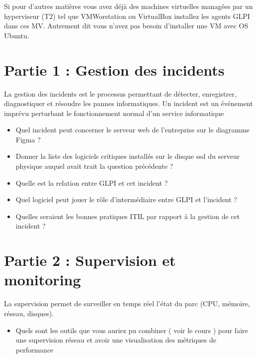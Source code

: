\documentclass[12pt, letterpaper]{article}
\begin{document}
\begin{tcolorbox}[colback=orange!5,colframe=orange!60!black,title=Attention]
Si pour d'autres matières vous avez déjà des machines virtuelles managées par un hyperviseur (T2) tel que VMWorstation ou VirtualBox 
installez les agents GLPI dans ces MV. Autrement dit vous n'avez pas besoin d'installer une VM avec OS Ubuntu.
\end{tcolorbox}

\section*{Partie 1 : Gestion des incidents}


\begin{tcolorbox}[colback=brown!5,colframe=brown!60!black,title=Définition]
    La gestion des incidents est le processus permettant de détecter, enregistrer, diagnostiquer et
résoudre les pannes informatiques.
Un incident est un événement imprévu perturbant le fonctionnement normal d’un service
informatique 
\end{tcolorbox}

\begin{itemize}
    \item Quel incident peut concerner le serveur web de l'entreprise sur le diagramme Figma ?
    \item Donner la liste des logiciels critiques installés sur le disque ssd du serveur physique auquel avait trait la question précédente ?
    \item Quelle est la relation entre GLPI et cet incident ?
    \item Quel logiciel peut jouer le rôle d'intermédiaire entre GLPI et l'incident ?
    \item Quelles seraient les bonnes pratiques ITIL par rapport à la gestion de cet incident ?
\end{itemize}


\section*{Partie 2 : Supervision et monitoring}


\begin{tcolorbox}[colback=brown!5,colframe=brown!60!black,title=Définition]
La supervision permet de surveiller en temps réel l’état du parc (CPU, mémoire, réseau,
disques).
\end{tcolorbox}



\begin{itemize}
    \item Quels sont les outils que vous auriez pu combiner ( voir le cours ) pour faire une supervision réseau et avoir une visualisation des métriques de performance
\end{itemize}
\end{document}
